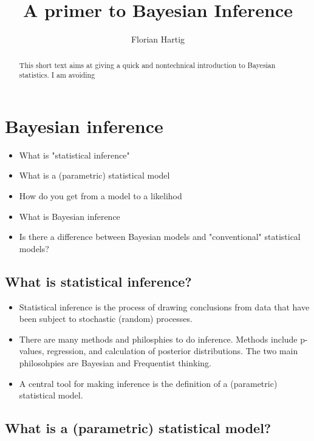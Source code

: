 \documentclass[10pt,a4paper]{article}
\author{Florian Hartig}
\title{A primer to Bayesian Inference}
\begin{document}
\maketitle

\begin{abstract}
This short text aims at giving a quick and nontechnical introduction to Bayesian statistics. I am avoiding 


\end{abstract}


\section{Bayesian inference}


\begin{mdframed}[frametitle={Ask yourself}]
\begin{itemize}
  \item What is "statistical inference"
  \item What is a (parametric) statistical model
  \item How do you get from a model to a likelihod
  \item What is Bayesian inference
  \item Is there a difference between Bayesian models and "conventional" statistical models?
\end{itemize}
\end{mdframed}

\subsection{What is statistical inference?}

\begin{itemize}
\item Statistical inference is the process of drawing conclusions from data that have been subject to stochastic (random) processes. 
\item There are many methods and philosphies to do inference. Methods include p-values, regression, and calculation of posterior distributions. The two main philosohpies are Bayesian and Frequentist thinking. 
\item A central tool for making inference is the definition of a (parametric) statistical model.
\end{itemize}


\subsection{What is a (parametric) statistical model?}
\end{document}
